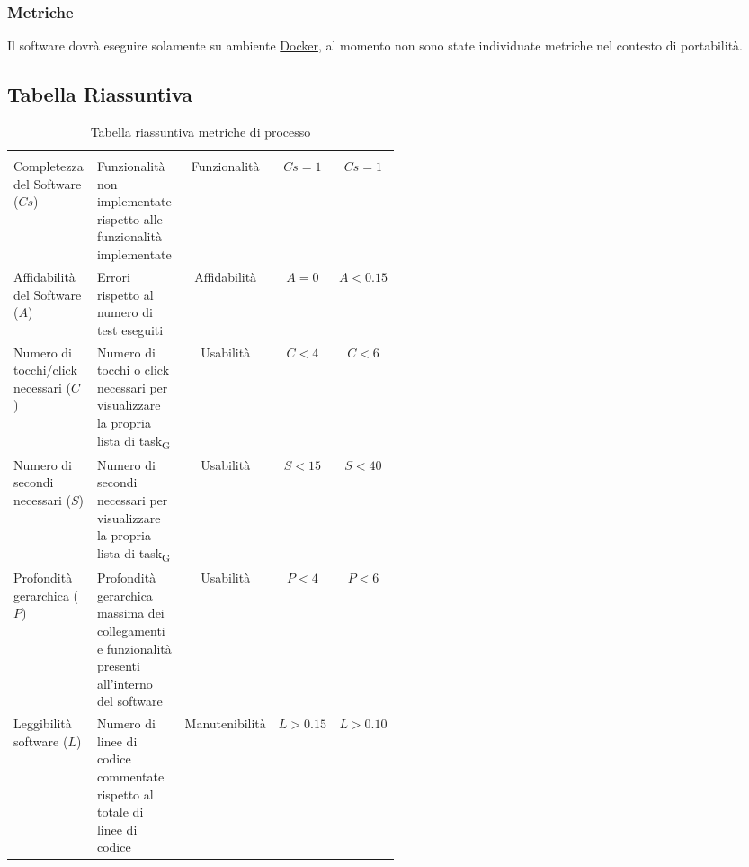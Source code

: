 \subsubsection{Metriche}
Il software dovrà eseguire solamente su ambiente \href{https://www.docker.com/why-docker}{Docker}, al momento non sono state individuate metriche nel contesto di portabilità.
\subsection{Tabella Riassuntiva}
\begin{table}[H]
	\begin{center}
		\caption{Tabella riassuntiva metriche di processo}
		\begin{tabular}{p{0.25\linewidth} p{0.25\linewidth}c!{\color[HTML]{9b240a}\vrule width 0.05cm}cc}
			\rowcolorhead
			         &                                                                            &  &  &  \\

			Completezza del Software ($Cs$)        & Funzionalità non implementate rispetto alle funzionalità implementate                               & Funzionalità                & $Cs = 1  $                 & $Cs = 1   $                  \\
			Affidabilità del Software ($A$)        & Errori rispetto al numero di test eseguiti                                                          & Affidabilità                & $A = 0   $                 & $A < 0.15 $                  \\
			Numero di tocchi/click necessari ($C$) & Numero di tocchi o click necessari per visualizzare la propria lista di \gls{task}\textsubscript{G} & Usabilità                   & $C < 4   $                 & $C < 6    $                  \\
			Numero di secondi necessari ($S$)      & Numero di secondi necessari per visualizzare la propria lista di \gls{task}\textsubscript{G}        & Usabilità                   & $S < 15  $                 & $S < 40   $                  \\
			Profondità gerarchica ($P$)            & Profondità gerarchica massima dei collegamenti e funzionalità presenti all'interno del software     & Usabilità                   & $P < 4   $                 & $P < 6    $                  \\
			Leggibilità software ($L$)             & Numero di linee di codice commentate rispetto al totale di linee di codice                          & Manutenibilità              & $L > 0.15$                 & $L > 0.10 $                  \\
		\end{tabular}

	\end{center}
\end{table}
